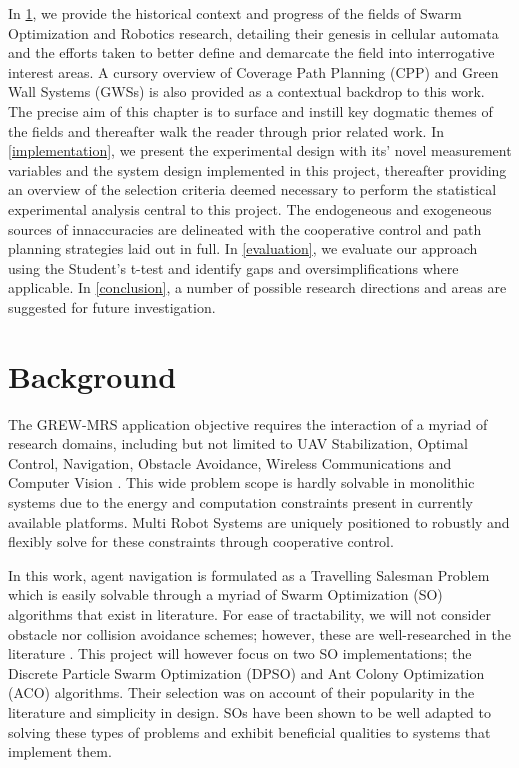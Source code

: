 \documentclass{report}
\begin{document}
In \ref{background}, we provide the historical context and progress of the fields of Swarm Optimization and Robotics research, detailing their genesis in cellular automata and the efforts taken to better define and demarcate the field into interrogative interest areas. A cursory overview of Coverage Path Planning (CPP) and Green Wall Systems (GWSs) is also provided as a contextual backdrop to this work. The precise aim of this chapter is to surface and instill key dogmatic themes of the fields and thereafter walk the reader through prior related work.  In \ref{implementation}, we present the experimental design with its' novel measurement variables and the system design implemented in this project, thereafter providing an overview of the selection criteria deemed necessary to perform the statistical experimental analysis central to this project. The endogeneous and exogeneous sources of innaccuracies are delineated with the cooperative control and path planning strategies laid out in full. In \ref{evaluation}, we evaluate our approach using the Student's t-test \cite{Kennedy1995} and identify gaps and oversimplifications where applicable. In \ref{conclusion}, a number of possible research directions and areas are suggested for future investigation.

\chapter{Background} \label{background}
The GREW-MRS application objective requires the interaction of a myriad of research domains, including but not limited to UAV Stabilization, Optimal Control, Navigation, Obstacle Avoidance, Wireless Communications and Computer Vision \cite{Guerrero2013}. This wide problem scope is hardly solvable in monolithic systems due to the energy and computation constraints present in currently available platforms. Multi Robot Systems are uniquely positioned to robustly and flexibly solve for these constraints through cooperative control.

In this work, agent navigation is formulated as a Travelling Salesman Problem which is easily solvable through a myriad of Swarm Optimization (SO) algorithms that exist in literature. For ease of tractability, we will not consider obstacle nor collision avoidance schemes; however, these are well-researched in the literature \cite{Galceran2013}. This project will however focus on two SO implementations; the Discrete Particle Swarm Optimization (DPSO) and Ant Colony Optimization (ACO) algorithms. Their selection was on account of their popularity in the literature \cite{Tan2013} and simplicity in design. SOs have been shown to be well adapted to solving these types of problems and exhibit beneficial qualities to systems that implement them.
\end{document}
